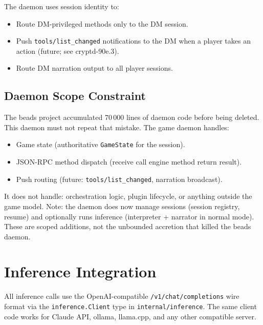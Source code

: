\documentclass[a4paper,10pt]{article}
\newcommand{\pkg}[1]{\texttt{#1}}
\begin{document}
The daemon uses session identity to:

\begin{itemize}
  \item Route DM-privileged methods only to the DM session.
  \item Push \texttt{tools/list\_changed} notifications to the DM
    when a player takes an action (future; see cryptd-90e.3).
  \item Route DM narration output to all player sessions.
\end{itemize}

\subsection{Daemon Scope Constraint}

The beads project accumulated 70\,000 lines of daemon code before
being deleted.  This daemon must not repeat that mistake.  The
game daemon handles:

\begin{itemize}
  \item Game state (authoritative \texttt{GameState} for the session).
  \item JSON-RPC method dispatch (receive call \textrightarrow{}
    engine method \textrightarrow{} return result).
  \item Push routing (future: \texttt{tools/list\_changed},
    narration broadcast).
\end{itemize}

It does not handle: orchestration logic, plugin lifecycle, or
anything outside the game model.  Note: the daemon does now manage
sessions (session registry, resume) and optionally runs inference
(interpreter + narrator in normal mode).  These are scoped
additions, not the unbounded accretion that killed the beads daemon.

\section{Inference Integration}

All inference calls use the OpenAI-compatible
\texttt{/v1/\allowbreak chat/\allowbreak completions} wire format
via the \texttt{inference.\allowbreak Client} type in
\pkg{internal/\allowbreak inference}.  The same client code works
for Claude API, ollama, llama.cpp, and any other compatible server.
\end{document}
